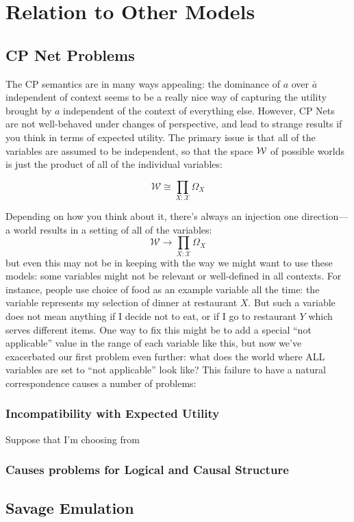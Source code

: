 \documentclass{article}
\theoremstyle{plain}
\theoremstyle{definition}
\theoremstyle{remark}
\begin{document}
	\section{Relation to Other Models}
			
	\subsection{CP Net Problems}
	The CP semantics are in many ways appealing: the dominance of $a$ over $\bar a$ independent of context seems to be a really nice way of capturing the utility brought by $a$ independent of the context of everything else. However, CP Nets are not well-behaved under changes of perspective, and lead to strange results if you think in terms of expected utility. The primary issue is that all of the variables are assumed to be independent, so that the space $\cal W$ of possible worlds is just the product of all of the individual variables:
	
	\[ \mathcal W \cong \prod_{X: \mathcal X} \Omega_X \] 
	
	Depending on how you think about it, there's always an injection one direction--- a world results in a setting of all of the variables:
	\[ \mathcal W \to \prod_{X: \mathcal X} \Omega_X \] 
	but even this may not be in keeping with the way we might want to use these models: some variables might not be relevant or well-defined in all contexts. For instance, people use choice of food as an example variable all the time: the variable represents my selection of dinner at restaurant $X$. But such a variable does not mean anything if I decide not to eat, or if I go to restaurant $Y$ which serves different items. One way to fix this might be to add a special ``not applicable'' value in the range of each variable like this, but now we've exacerbated our first problem even further: what does the world where ALL variables are set to ``not applicable'' look like? This failure to have a natural correspondence causes a number of problems:
	
	\subsubsection{Incompatibility with Expected Utility}
	
	Suppose that I'm choosing from 
	
	\subsubsection{Causes problems for Logical and Causal Structure}
	
	\subsection{Savage Emulation}
	
	\printbibliography
	
\end{document}
